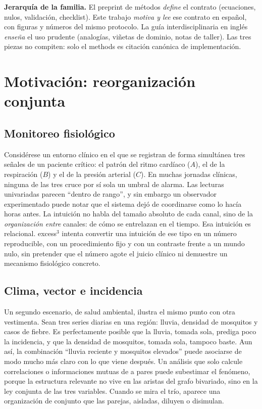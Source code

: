 \documentclass[11pt,a4paper]{article}
\begin{document}
\begin{idea}
\textbf{Jerarqu\'ia de la familia.} El preprint de m\'etodos
\citep{Padilla2026excess3} \emph{define} el contrato (ecuaciones, nulos,
validaci\'on, checklist). Este trabajo \emph{motiva y lee} ese contrato en
espa\~nol, con figuras y n\'umeros del mismo protocolo. La gu\'ia
interdisciplinaria en ingl\'es \citep{Padilla2026primer} \emph{ense\~na} el
uso prudente (analog\'ias, vi\~netas de dominio, notas de taller). Las tres
piezas no compiten: solo el methods es citaci\'on can\'onica de
implementaci\'on.
\end{idea}

\section{Motivaci\'on: reorganizaci\'on conjunta}
\label{sec:historia}

\subsection{Monitoreo fisiol\'ogico}

Consid\'erese un entorno cl\'inico en el que se registran de forma simult\'anea
tres se\~nales de un paciente cr\'itico: el patr\'on del ritmo card\'iaco
($A$), el de la respiraci\'on ($B$) y el de la presi\'on arterial ($C$). En
muchas jornadas cl\'inicas, ninguna de las tres cruce por s\'i sola un umbral
de alarma. Las lecturas univariadas parecen ``dentro de rango'', y sin
embargo un observador experimentado puede notar que el sistema dej\'o de
coordinarse como lo hac\'ia horas antes. La intuici\'on no habla del tama\~no
absoluto de cada canal, sino de la \emph{organizaci\'on entre} canales: de
c\'omo se entrelazan en el tiempo. Esa intuici\'on es relacional. excess$^3$
intenta convertir una intuici\'on de ese tipo en un n\'umero reproducible,
con un procedimiento fijo y con un contraste frente a un mundo nulo, sin
pretender que el n\'umero agote el juicio cl\'inico ni demuestre un mecanismo
fisiol\'ogico concreto.

\subsection{Clima, vector e incidencia}

Un segundo escenario, de salud ambiental, ilustra el mismo punto con otra
vestimenta. Sean tres series diarias en una regi\'on: lluvia, densidad de
mosquitos y casos de fiebre. Es perfectamente posible que la lluvia, tomada
sola, prediga poco la incidencia, y que la densidad de mosquitos, tomada
sola, tampoco baste. Aun as\'i, la combinaci\'on ``lluvia reciente y
mosquitos elevados'' puede asociarse de modo mucho m\'as claro con lo que
viene despu\'es. Un an\'alisis que solo calcule correlaciones o informaciones
mutuas de a pares puede subestimar el fen\'omeno, porque la estructura
relevante no vive en las aristas del grafo bivariado, sino en la ley
conjunta de las tres variables. Cuando se mira el tr\'io, aparece una
organizaci\'on de conjunto que las parejas, aisladas, diluyen o disimulan.
\end{document}
